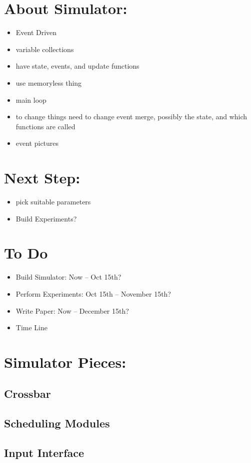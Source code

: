 \documentclass{IEEEtran}%
\begin{document}
\section{About Simulator:}
\begin{itemize}
\item Event Driven
\item variable collections
\item have state, events, and update functions
\item use memoryless thing
\item main loop
\item to change things need to change event merge, possibly the state, and which functions are called
\item event pictures
\end{itemize}

\section{Next Step:}
\begin{itemize}
\item pick suitable parameters
\item Build Experiments?
\end{itemize}
\section{To Do}
\begin{itemize}
\item Build Simulator: Now -- Oct 15th?
\item Perform Experiments: Oct 15th -- November 15th?
\item Write Paper: Now -- December 15th?
\item Time Line
\end{itemize}

\section{Simulator Pieces:}
\subsection{Crossbar}
\subsection{Scheduling Modules}
\subsection{Input Interface}
\end{document}
